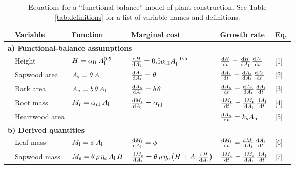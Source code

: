 \documentclass[9pt,twocolumn,twoside,lineno]{pnas-new}
\begin{document}
\begin{table*}
\caption{Equations for a ``functional-balance'' model of plant construction. See Table \ref{tab:definitions} for a list of variable names and definitions.}
\centering
  \begin{tabular}{p{0.1cm}p{2.5cm}p{3cm}p{4cm}p{2.5cm}p{0.75cm}}
  \toprule
  & Variable & Function & Marginal cost & Growth rate & Eq.\\
  \midrule
  \multicolumn{6}{l}{\textbf{a) Functional-balance assumptions}} \\
  & Height &
    $H = \alpha_{\rm l1} \, A_{\rm l}^{0.5}$ &
    $\frac{{\rm d}H}{{\rm d}A_{\rm l}} = 0.5 \alpha_{\rm l1} A_{\rm l}^{-0.5}$ &
    $\frac{{\rm d}H}{{\rm d}t}  = \frac{{\rm d}H}{{\rm d}A_{\rm l}} \, \frac{{\rm d}A_{\rm l}}{{\rm d}t}$ &  [1]\\
  & Sapwood area &
    $A_{\rm s} = \theta \, A_{\rm l}$ &
    $\frac{{\rm d}A_{\rm s}}{{\rm d} A_{\rm l}} = \theta$ &
    $\frac{{\rm d}A_{\rm s}}{{\rm d}t}  =\frac{{\rm d}A_{\rm s}}{{\rm d} A_{\rm l}} \, \frac{{\rm d}A_{\rm l}}{{\rm d}t}$ & [2]\\
  & Bark area &
    $A_{\rm b} = b \, \theta \, A_{\rm l}$ &
    $\frac{{\rm d}A_{\rm b}}{{\rm d} A_{\rm l}} = b \, \theta$ &
    $\frac{{\rm d}A_{\rm b}}{{\rm d}t} = \frac{{\rm d}A_{\rm b}}{{\rm d} A_{\rm l}} \, \frac{{\rm d}A_{\rm l}}{{\rm d}t}$ & [3]\\
  & Root mass &
    $M_{\rm r} = \alpha_{\rm r1} \, A_{\rm l}$ &
    $\frac{{\rm d}M_{\rm r}}{{\rm d}A_{\rm l}} = \alpha_{\rm r1}$  &
    $\frac{{\rm d}M_{\rm r}}{{\rm d}t}  = \frac{{\rm d}M_{\rm r}}{{\rm d}A_{\rm l}}  \, \frac{{\rm d}A_{\rm l}}{{\rm d}t}$ & [4]\\
  & Heartwood area & & &
    $\frac{{\rm d}A_{\rm h}}{{\rm d} t}  = k_{s} A_{\rm h} $ & [5]\\
  \multicolumn{6}{l}{\textbf{b) Derived quantities}} \\
  & Leaf mass &
    $M_{\rm l} = \phi \, A_{\rm l} $ &
    $\frac{{\rm d}M_{\rm l}}{{\rm d}A_{\rm l}} = \phi$ &
    $\frac{{\rm d}M_{\rm l}}{{\rm d}t}  = \frac{{\rm d}M_{\rm l}}{{\rm d}A_{\rm l}}  \, \frac{{\rm d}A_{\rm l}}{{\rm d}t}$ & [6]\\
  & Sapwood mass &
    $M_{\rm s} = \theta \, \rho \, \eta_c \, A_{\rm l} \, H $ &
    $\frac{{\rm d}M_{\rm s}}{{\rm d}A_{\rm l}} = \theta\, \rho\, \eta_c\, \big( H + A_{\rm l}\, \frac{{\rm d}H}{{\rm d}A_{\rm l}} \big)$ &
    $\frac{{\rm d}M_{\rm s}}{{\rm d}t}  = \frac{{\rm d}M_{\rm s}}{{\rm d}A_{\rm l}} \, \frac{{\rm d}A_{\rm l}}{{\rm d}t}$ & [7]\\

\end{tabular}
\end{table*}
\end{document}

